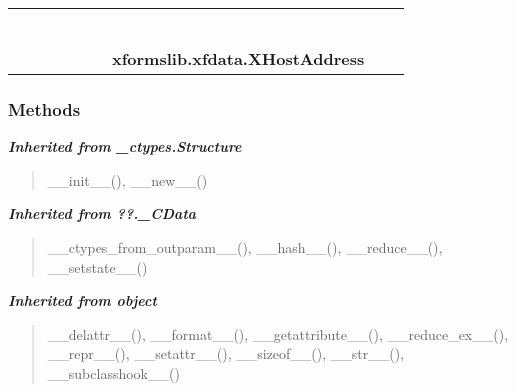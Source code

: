     \label{xformslib:xfdata:XHostAddress}
\begin{tabular}{cccccccccc}
\multicolumn{2}{r}{\settowidth{\BCL}{object}\multirow{2}{\BCL}{object}}
&&
&&
&&
  \\\cline{3-3}
  &&\multicolumn{1}{c|}{}
&&
&&
&&
  \\
\multicolumn{4}{r}{\settowidth{\BCL}{??.\_CData}\multirow{2}{\BCL}{??.\_CData}}
&&
&&
  \\\cline{5-5}
  &&&&\multicolumn{1}{c|}{}
&&
&&
  \\
\multicolumn{6}{r}{\settowidth{\BCL}{\_ctypes.Structure}\multirow{2}{\BCL}{\_ctypes.Structure}}
&&
  \\\cline{7-7}
  &&&&&&\multicolumn{1}{c|}{}
&&
  \\
&&&&&&\multicolumn{2}{l}{\textbf{xformslib.xfdata.XHostAddress}}
\end{tabular}



  \subsubsection{Methods}


\large{\textbf{\textit{Inherited from \_ctypes.Structure}}}

\begin{quote}
\_\_init\_\_(), \_\_new\_\_()
\end{quote}

\large{\textbf{\textit{Inherited from ??.\_CData}}}

\begin{quote}
\_\_ctypes\_from\_outparam\_\_(), \_\_hash\_\_(), \_\_reduce\_\_(), \_\_setstate\_\_()
\end{quote}

\large{\textbf{\textit{Inherited from object}}}

\begin{quote}
\_\_delattr\_\_(), \_\_format\_\_(), \_\_getattribute\_\_(), \_\_reduce\_ex\_\_(), \_\_repr\_\_(), \_\_setattr\_\_(), \_\_sizeof\_\_(), \_\_str\_\_(), \_\_subclasshook\_\_()
\end{quote}


